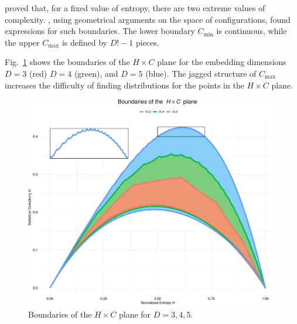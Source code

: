 \citet{SomeFeaturesoftheLMCStatisticalComplexity} proved that, for a fixed value of entropy, there are two extreme values of complexity.
\citet{GeneralizedStatisticalComplexityMeasuresGeometricalAnalyticalProperties}, using geometrical arguments on the space of configurations, found expressions for such boundaries.
The lower boundary $C_{\min}$ is continuous, while the upper $C_{\max}$ is defined by $D!-1$ pieces.

Fig.~\ref{fig:Boundaries} shows the boundaries of the $H\times C$ plane for the embedding dimensions $D=3$ (red) $D=4$ (green), and $D=5$ (blue).
The jagged structure of $C_{\max}$ increases the difficulty of finding distributions for the points in the $H\times C$ plane.

\begin{figure}[hbt]
    \centering
    \includegraphics[width=\linewidth]{Figures/BoundariesPlot}
    \caption{Boundaries of the $H\times C$ plane for $D=3,4,5$.}\label{fig:Boundaries}
\end{figure}

